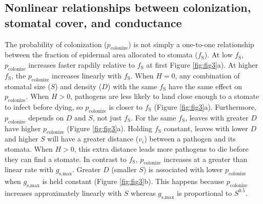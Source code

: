 \documentclass[utf8]{frontiersSCNS}
\newcommand{\fs}{$f_\text{S}$}
\newcommand{\gsmax}{$g_\text{s,max}$}
\begin{document}
\hypertarget{nonlinear-relationships-between-colonization-stomatal-cover-and-conductance}{%
\subsection*{Nonlinear relationships between colonization, stomatal
cover, and
conductance}\label{nonlinear-relationships-between-colonization-stomatal-cover-and-conductance}}

The probability of colonization (\(p_\text{colonize}\)) is not simply a
one-to-one relationship between the fraction of epidermal area allocated
to stomata (\fs). At low \fs, \(p_\text{colonize}\) increases faster
rapdily relative to \fs{} at first Figure \ref{fig:fig3}a). At higher
\fs, the \(p_\text{colonize}\) increases linearly with \fs. When
\(H = 0\), any combination of stomatal size (\(S\)) and density (\(D\))
with the same \fs{} have the same effect on \(p_\text{colonize}\). When
\(H > 0\), pathogens are less likely to land close enough to a stomate
to infect before dying, so \(p_\text{colonize}\) is closer to \fs{}
(Figure \ref{fig:fig3}a). Furthermore, \(p_\text{colonize}\) depends on
\(D\) and \(S\), not just \fs. For the same \fs, leaves with greater
\(D\) have higher \(p_\text{colonize}\) (Figure \ref{fig:fig3}a).
Holding \fs{} constant, leaves with lower \(D\) and higher \(S\) will
have a greater distance (\(v_i\)) between a pathogen and its stomata.
When \(H > 0\), this extra distance leads more pathogens to die before
they can find a stomate. In contrast to \fs, \(p_\text{colonize}\)
increases at a greater than linear rate with \gsmax. Greater \(D\)
(smaller \(S\)) is associated with lower \(p_\text{colonize}\) when
\gsmax{} is held constant (Figure \ref{fig:fig3}b). This happens because
\(p_\text{colonize}\) increases approximately linearly with \(S\)
whereas \gsmax{} is proportional to \(S^{0.5}\).
\end{document}
